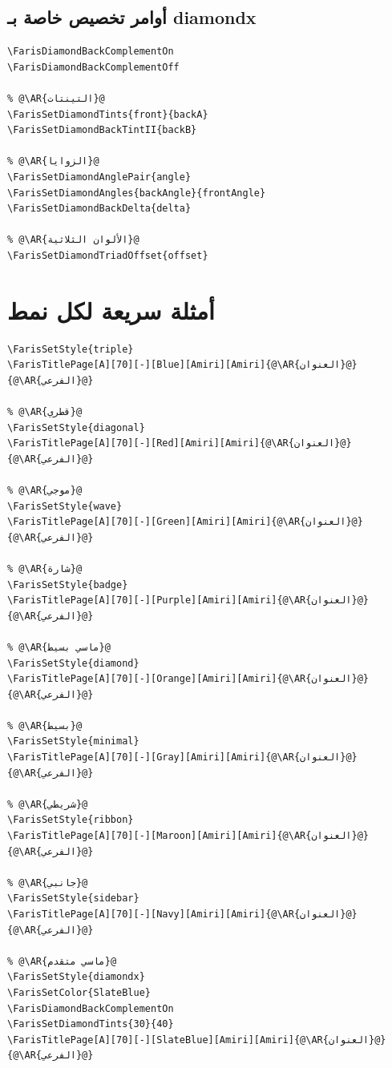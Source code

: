 \documentclass[a4paper,12pt]{report}
\newcommand{\AR}[1]{\(\text{\beginR\arabicfont #1\endR}\)}
\def\textenglish#1{#1}%
\begin{document}
\subsection{أوامر تخصيص خاصة بـ \textenglish{diamondx}}

\begin{english}
\begin{lstlisting}[style=fariscode]
% @\AR{الألوان المتممة}@
\FarisDiamondBackComplementOn
\FarisDiamondBackComplementOff

% @\AR{التينتات}@
\FarisSetDiamondTints{front}{backA}
\FarisSetDiamondBackTintII{backB}

% @\AR{الزوايا}@
\FarisSetDiamondAnglePair{angle}
\FarisSetDiamondAngles{backAngle}{frontAngle}
\FarisSetDiamondBackDelta{delta}

% @\AR{الألوان الثلاثية}@
\FarisSetDiamondTriadOffset{offset}
\end{lstlisting}
\end{english}

\newpage

\section{أمثلة سريعة لكل نمط}

\begin{english}
\begin{lstlisting}[style=fariscode]
% @\AR{ثلاثي}@
\FarisSetStyle{triple}
\FarisTitlePage[A][70][-][Blue][Amiri][Amiri]{@\AR{العنوان}@}{@\AR{الفرعي}@}

% @\AR{قطري}@
\FarisSetStyle{diagonal}
\FarisTitlePage[A][70][-][Red][Amiri][Amiri]{@\AR{العنوان}@}{@\AR{الفرعي}@}

% @\AR{موجي}@
\FarisSetStyle{wave}
\FarisTitlePage[A][70][-][Green][Amiri][Amiri]{@\AR{العنوان}@}{@\AR{الفرعي}@}

% @\AR{شارة}@
\FarisSetStyle{badge}
\FarisTitlePage[A][70][-][Purple][Amiri][Amiri]{@\AR{العنوان}@}{@\AR{الفرعي}@}

% @\AR{ماسي بسيط}@
\FarisSetStyle{diamond}
\FarisTitlePage[A][70][-][Orange][Amiri][Amiri]{@\AR{العنوان}@}{@\AR{الفرعي}@}

% @\AR{بسيط}@
\FarisSetStyle{minimal}
\FarisTitlePage[A][70][-][Gray][Amiri][Amiri]{@\AR{العنوان}@}{@\AR{الفرعي}@}

% @\AR{شريطي}@
\FarisSetStyle{ribbon}
\FarisTitlePage[A][70][-][Maroon][Amiri][Amiri]{@\AR{العنوان}@}{@\AR{الفرعي}@}

% @\AR{جانبي}@
\FarisSetStyle{sidebar}
\FarisTitlePage[A][70][-][Navy][Amiri][Amiri]{@\AR{العنوان}@}{@\AR{الفرعي}@}

% @\AR{ماسي متقدم}@
\FarisSetStyle{diamondx}
\FarisSetColor{SlateBlue}
\FarisDiamondBackComplementOn
\FarisSetDiamondTints{30}{40}
\FarisTitlePage[A][70][-][SlateBlue][Amiri][Amiri]{@\AR{العنوان}@}{@\AR{الفرعي}@}
\end{lstlisting}
\end{english}
\end{document}
